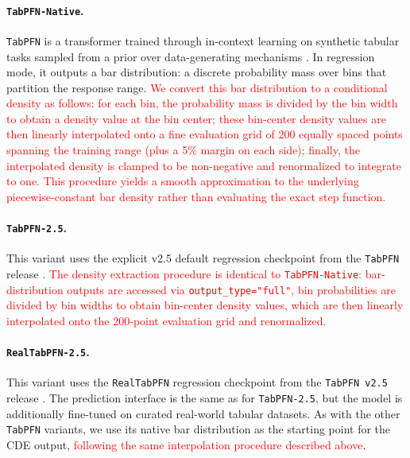 \documentclass{article}
\newcommand{\method}[1]{\texttt{#1}}
\begin{document}
\paragraph{\method{TabPFN-Native}.}
\method{TabPFN} is a transformer trained through in-context learning on
synthetic tabular tasks sampled from a prior over data-generating mechanisms
\citep{hollmann2025tabpfn}. In regression mode, it outputs a bar distribution:
a discrete probability mass over bins that partition the response range. \textcolor{red}{We convert this bar distribution to a conditional density as follows: for each bin, the probability mass is divided by the bin width to obtain a density value at the bin center; these bin-center density values are then linearly interpolated onto a fine evaluation grid of 200 equally spaced points spanning the training range (plus a 5\% margin on each side); finally, the interpolated density is clamped to be non-negative and renormalized to integrate to one. This procedure yields a smooth approximation to the underlying piecewise-constant bar density rather than evaluating the exact step function.}

\paragraph{\method{TabPFN-2.5}.}
This variant uses the explicit v2.5 default regression checkpoint from the
\method{TabPFN} release \citep{hollmann2025tabpfn}. \textcolor{red}{The density extraction
procedure is identical to \method{TabPFN-Native}: bar-distribution outputs are
accessed via \texttt{output\_type="full"}, bin probabilities are divided by bin
widths to obtain bin-center density values, which are then linearly interpolated
onto the 200-point evaluation grid and renormalized.}

\paragraph{\method{RealTabPFN-2.5}.}
This variant uses the \method{RealTabPFN} regression checkpoint from the
\method{TabPFN~v2.5} release \citep{hollmann2025tabpfn}. The prediction
interface is the same as for \method{TabPFN-2.5}, but the model is additionally
fine-tuned on curated real-world tabular datasets. As with the other
\method{TabPFN} variants, we use its native bar distribution as the starting
point for the CDE output, \textcolor{red}{following the same interpolation procedure described above}.
\end{document}
